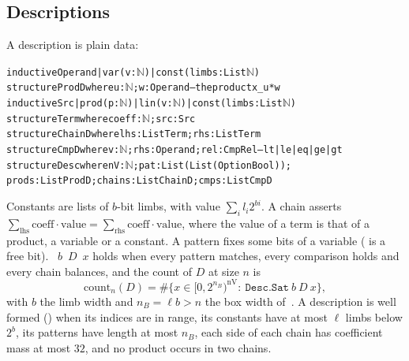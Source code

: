 \documentclass[10pt]{amsart}
\theoremstyle{plain}
\theoremstyle{definition}
\theoremstyle{remark}
\numberwithin{equation}{section}
\begin{document}
\subsection{Descriptions}
A description is plain data:
\begin{alltt}\footnotesize
inductive Operand | var (v : \(\mathbb{N}\)) | const (limbs : List \(\mathbb{N}\))
structure ProdD where u : \(\mathbb{N}\); w : Operand            -- the product x_u * w
inductive Src | prod (p : \(\mathbb{N}\)) | lin (v : \(\mathbb{N}\)) | const (limbs : List \(\mathbb{N}\))
structure Term where coeff : \(\mathbb{N}\); src : Src
structure ChainD where lhs : List Term; rhs : List Term
structure CmpD where v : \(\mathbb{N}\); rhs : Operand; rel : CmpRel   -- lt | le | eq | ge | gt
structure Desc where nV : \(\mathbb{N}\); pat : List (List (Option Bool));
  prods : List ProdD; chains : List ChainD; cmps : List CmpD
\end{alltt}
Constants are lists of $b$-bit limbs, with value $\sum_il_i2^{bi}$. A chain asserts
$\sum_{\mathrm{lhs}}\mathrm{coeff}\cdot\mathrm{value}=\sum_{\mathrm{rhs}}\mathrm{coeff}\cdot\mathrm{value}$,
where the value of a term is that of a product, a variable or a constant. A pattern fixes some bits of a
variable ( is a free bit). ~$b$~$D$~$x$ holds when every pattern matches, every
comparison holds and every chain balances, and the count of $D$ at size $n$ is
\[
  \mathrm{count}_n(D)=\#\bigl\{x\in[0,2^{n_B})^{\mathrm{nV}}:\ \texttt{Desc.Sat}\ b\ D\ x\bigr\},
\]
with $b$ the limb width and $n_B=\ell b>n$ the box width of~\cite[\S4]{TulFac26}. A description is well formed
() when its indices are in range, its constants have at most $\ell$ limbs below $2^b$, its
patterns have length at most $n_B$, each side of each chain has coefficient mass at most $32$, and no
product occurs in two chains.
\end{document}
